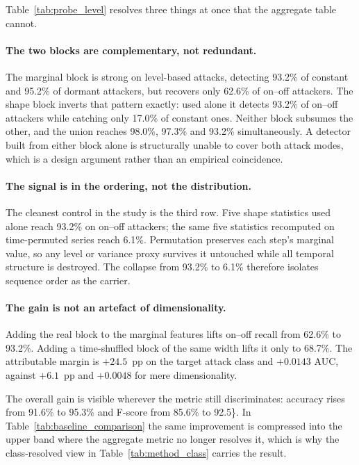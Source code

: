 \documentclass[notspecified,article,submit,moreauthors]{Definitions/mdpi}
\begin{document}
Table~\ref{tab:probe_level} resolves three things at once that the aggregate table cannot.

\paragraph{The two blocks are complementary, not redundant.} The marginal block is strong on level-based attacks, detecting 93.2\% of constant and 95.2\% of dormant attackers, but recovers only 62.6\% of on--off attackers. The shape block inverts that pattern exactly: used alone it detects 93.2\% of on--off attackers while catching only 17.0\% of constant ones. Neither block subsumes the other, and the union reaches 98.0\%, 97.3\% and 93.2\% simultaneously. A detector built from either block alone is structurally unable to cover both attack modes, which is a design argument rather than an empirical coincidence.

\paragraph{The signal is in the ordering, not the distribution.} The cleanest control in the study is the third row. Five shape statistics used alone reach 93.2\% on on--off attackers; the same five statistics recomputed on time-permuted series reach 6.1\%. Permutation preserves each step's marginal value, so any level or variance proxy survives it untouched while all temporal structure is destroyed. The collapse from 93.2\% to 6.1\% therefore isolates sequence order as the carrier.

\paragraph{The gain is not an artefact of dimensionality.} Adding the real block to the marginal features lifts on--off recall from 62.6\% to 93.2\%. Adding a time-shuffled block of the same width lifts it only to 68.7\%. The attributable margin is $+24.5$~pp on the target attack class and $+0.0143$ AUC, against $+6.1$~pp and $+0.0048$ for mere dimensionality.

The overall gain is visible wherever the metric still discriminates: accuracy rises from 91.6\% to 95.3\% and F-score from 85.6\% to 92.5\}. In Table~\ref{tab:baseline_comparison} the same improvement is compressed into the upper band where the aggregate metric no longer resolves it, which is why the class-resolved view in Table~\ref{tab:method_class} carries the result.
\end{document}

